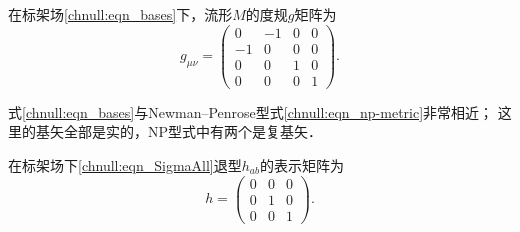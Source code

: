 在标架场\eqref{chnull:eqn_bases}下，流形$M$的度规$g$矩阵为
\begin{equation}\label{chnull:eqn_gab}
    g_{\mu\nu}=\begin{pmatrix}
        0& -1&0 &0 \\ -1& 0&0 &0 \\ 
        0&0& 1&0 \\0&0& 0 & 1
    \end{pmatrix}.
\end{equation}

式\eqref{chnull:eqn_bases}与Newman--Penrose型式\eqref{chnull:eqn_np-metric}非常相近；
这里的基矢全部是实的，NP型式中有两个是复基矢．



在标架场下\eqref{chnull:eqn_SigmaAll}退型$h_{ab}$的表示矩阵为
\begin{equation}\label{chnull:eqn_hij}
    h=\begin{pmatrix}
        0&0&0 \\ 0& 1 &0 \\0& 0 & 1
    \end{pmatrix}.
\end{equation}





